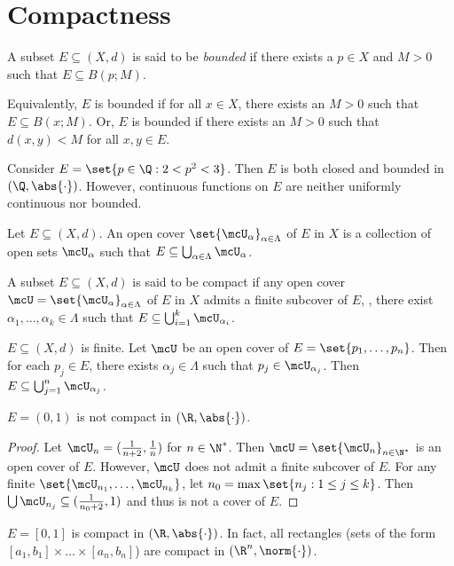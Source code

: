 \section{Compactness} \label{sec:compactness}

\begin{definition*} \label{def:bounded}
    A subset $E \subseteq (X, d)$ is said to be \emph{bounded} if there
    exists a $p \in X$ and $M > 0$ such that $E \subseteq B(p; M)$.
\end{definition*}
Equivalently, $E$ is bounded if for all $x \in X$, there exists an $M > 0$
such that $E \subseteq B(x; M)$.
Or, $E$ is bounded if there exists an $M > 0$ such that
$d(x, y) < M$ for all $x, y \in E$.

Consider $E = \set{p \in \Q : 2 < p^2 < 3}$.
Then $E$ is both closed and bounded in $(\Q, \abs{\cdot})$.
However, continuous functions on $E$ are neither uniformly continuous nor
bounded.

\begin{definition} \label{def:open_cover}
    Let $E \subseteq (X, d)$.
    An open cover $\set{\mcU_\alpha}_{\alpha \in \Lambda}$ of $E$ in $X$ is
    a collection of open sets $\mcU_\alpha$ such that
    $E \subseteq \bigcup_{\alpha \in \Lambda} \mcU_\alpha$.
\end{definition}

\begin{definition*} \label{def:compact}
    A subset $E \subseteq (X, d)$ is said to be compact if any open cover
    $\mcU = \set{\mcU_\alpha}_{\alpha \in \Lambda}$ of $E$ in $X$ admits a
    finite subcover of $E$, \ie, there exist
    $\alpha_1, \dots, \alpha_k \in \Lambda$ such that $E \subseteq
    \bigcup_{i = 1}^k \mcU_{\alpha_i}$.
\end{definition*}

\begin{examples}
    \item $E \subseteq (X, d)$ is finite.
    Let $\mcU$ be an open cover of $E = \set{p_1, \dots, p_n}$.
    Then for each $p_j \in E$, there exists $\alpha_j \in \Lambda$ such that
    $p_j \in \mcU_{\alpha_j}$.
    Then $E \subseteq \bigcup_{j = 1}^n \mcU_{\alpha_j}$.
    \item $E = (0, 1)$ is not compact in $(\R, \abs{\cdot})$.
    \begin{proof}
        Let $\mcU_n = (\frac1{n+2}, \frac1n)$ for $n \in \N^*$.
        Then $\mcU = \set{\mcU_n}_{n \in \N^*}$ is an open cover of $E$.
        However, $\mcU$ does not admit a finite subcover of $E$.
        For any finite $\set{\mcU_{n_1}, \dots, \mcU_{n_k}}$, let
        $n_0 = \max\set{n_j : 1 \le j \le k}$.
        Then $\bigcup \mcU_{n_j} \subseteq (\frac1{n_0 + 2}, 1)$ and thus is
        not a cover of $E$.
    \end{proof}
    \item $E = [0, 1]$ is compact in $(\R, \abs{\cdot})$.
    In fact, all rectangles (sets of the form
    $[a_1, b_1] \times \dots \times [a_n, b_n]$) are compact in
    $(\R^n, \norm{\cdot})$.
\end{examples}

